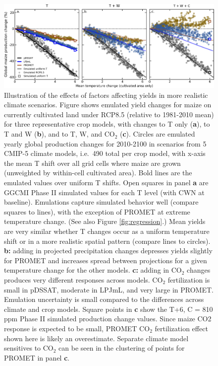\documentclass[gmd, manuscript]{copernicus} %
\begin{document}
\begin{figure}[ht]
    \centering
    \includegraphics[width = 16.3cm]{figures/global_em_maize.png}
    \caption{
    Illustration of the effects of factors affecting yields in more realistic climate scenarios. 
    Figure shows emulated yield changes for maize on currently cultivated land under RCP8.5 (relative to 1981-2010 mean) for three representative crop models, with changes to T only (\textbf{a}), to T and W (\textbf{b}), and to T, W, and CO$_2$ (\textbf{c}).
    Circles are emulated yearly global production changes for 2010-2100 in scenarios from 5 CMIP-5 climate models, i.e.\ 490 total per crop model, with x-axis the mean T shift over all grid cells where maize are grown (unweighted by within-cell cultivated area).
    Bold lines are the emulated values over uniform T shifts. 
    Open squares in panel \textbf{a} are GGCMI Phase II simulated values for each T level (with CWN at baseline).  
    Emulations capture simulated behavior well (compare squares to lines), with the exception of PROMET at extreme temperature change. (See also Figure \ref{fig:regression}.)
    Mean yields are very similar whether T changes occur as a uniform temperature shift or in a more realistic spatial pattern (compare lines to circles). 
    \textbf{b:} adding in projected precipitation changes depresses yields slightly for PROMET and increases spread between projections for a given temperature change for the other models. 
    \textbf{c:} adding in CO$_2$ changes produces very different responses across models. 
    CO$_2$ fertilization is small in pDSSAT, moderate in LPJmL, and very large in PROMET. 
    Emulation uncertainty is small compared to the differences across climate and crop models.
    Square points in \textbf{c} show the T+6, C = 810 ppm Phase II simulated production change values.
    Since maize CO2 response is expected to be small, PROMET CO$_2$ fertilization effect shown here is likely an overestimate. 
    Separate climate model sensitives to CO$_2$ can be seen in the clustering of points for PROMET in panel \textbf{c}.
    }
    \label{fig:globe_em}
\end{figure}
\end{document}
